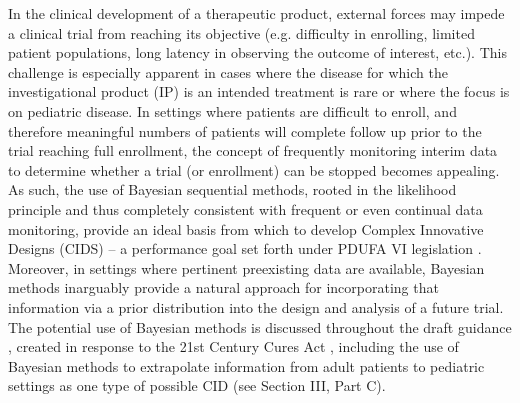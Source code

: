 \documentclass[useAMS,usenatbib,referee]{biom}
\begin{document}
In the clinical development of a therapeutic product, external forces may impede a clinical trial from reaching its objective (e.g. difficulty in enrolling, limited patient populations, long latency in observing the outcome of interest, etc.). 
%
This challenge is especially apparent in cases where the disease for which the investigational product (IP) is an intended treatment is rare or where the focus is on pediatric disease. 
%
In settings where patients are difficult to enroll, and therefore meaningful numbers of patients will complete follow up prior to the trial reaching full enrollment, the concept of frequently monitoring interim data to determine whether a trial (or enrollment) can be stopped becomes appealing. 
%
As such, the use of Bayesian sequential methods, rooted in the likelihood principle and thus completely consistent with frequent or even continual data monitoring, provide an ideal basis from which to develop Complex Innovative Designs (CIDS) – a performance goal set forth under PDUFA VI legislation \citep{FDA2017}.
%
Moreover, in settings where pertinent preexisting data are available, Bayesian methods inarguably provide a natural approach for incorporating that information via a prior distribution into the design and analysis of a future trial.
%
The potential use of Bayesian methods is discussed throughout the draft guidance \citep{FDA_CID}, created in response to the 21st Century Cures Act \citep{USCongress2016}, including the use of Bayesian methods to extrapolate information from adult patients to pediatric settings as one type of possible CID (see Section III, Part C).
\end{document}
